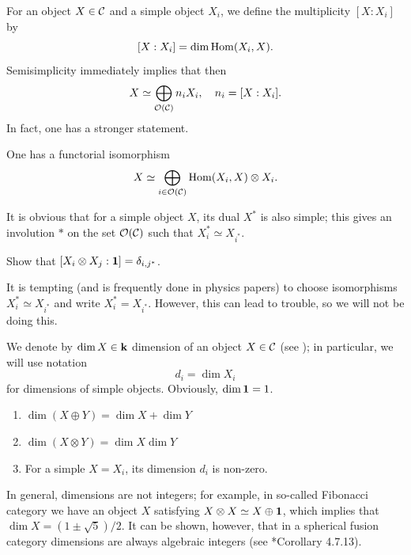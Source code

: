 For an object $X\in \mathcal{C}$ and a simple object $X_i$, we define the multiplicity
$[X:X_i]$ by
$$
  [X:X_i]=\dim \operatorname{Hom}(X_i, X).
$$
Semisimplicity immediately implies
that then
$$
  X\simeq \bigoplus_{\mathcal{O}(\mathcal{C})} n_i X_i, \quad n_i = [X:X_i].
$$
In fact, one has a stronger statement.
\begin{lemma}\label{l:simple}
  One has a functorial isomorphism
  $$
    X\simeq \bigoplus_{i\in\mathcal{O}(\mathcal{C})} \operatorname{Hom}(X_i, X)\otimes X_i.
  $$
\end{lemma}

It is
obvious that for a simple object $X$, its dual $X^*$ is also simple; this gives
an involution $*$ on the set $\mathcal{O}(\mathcal{C})$ such that $X_i^*\simeq X_{i^*}$.

\begin{exercise}\label{ec:duality-spherical}
  Show that $[X_i\otimes X_j:\mathbf{1}]=\delta_{i, j^*}$.
\end{exercise}

\begin{remark}
  It is tempting (and is frequently done in physics papers) to choose
  isomorphisms $X_{i}^*\simeq X_{i^*}$ and write $X_i^*=X_{i^*}$. However, this
  can lead to trouble, so we will not be doing this.
\end{remark}


We denote by $\dim X\in \mathbf{k}$ dimension of an object $X\in \mathcal{C}$ (see
); in particular, we will use notation
$$
d_i=\dim X_i
$$
for dimensions of simple objects. Obviously, $\dim \mathbf{1} =1$.

\begin{lemma}\label{l:dim-properties} \par\noindent
  \begin{enumerate}
    \item $\dim (X\oplus Y)= \dim X +\dim Y$
    \item $\dim (X\otimes Y)= \dim X \dim Y$
    \item For a simple $X=X_i$, its dimension $d_i$ is non-zero.
  \end{enumerate}
\end{lemma}

\begin{remark}
  In general, dimensions are not integers; for example, in so-called Fibonacci
  category we have an object $X$ satisfying $X\otimes X\simeq X\oplus \mathbf{1}$,
  which implies that $\dim X= (1\pm \sqrt{5})/2$. It can be shown, however, that
  in a spherical fusion category dimensions are always algebraic integers (see
  *{Corollary 4.7.13}).
\end{remark}

